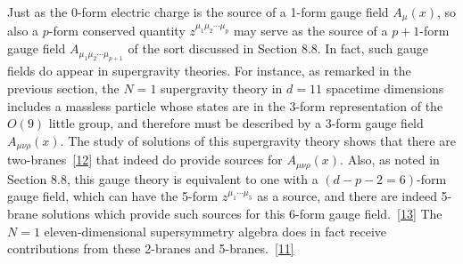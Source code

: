 Just as the 0-form electric charge is the source of a 1-form gauge field
\(A_\mu(x)\), so also a \(p\)-form conserved quantity
\(z^{\mu_1\mu_2\cdots\mu_p}\) may serve as the source of a \(p+1\)-form
gauge field \(A_{\mu_1\mu_2\cdots\mu_{p+1}}\) of the sort discussed in
Section 8.8. In fact, such gauge fields do appear in supergravity
theories. For instance, as remarked in the previous section, the \(N=1\)
supergravity theory in \(d=11\) spacetime dimensions includes a massless
particle whose states are in the 3-form representation of the \(O(9)\)
little group, and therefore must be described by a 3-form gauge field
\(A_{\mu\nu\rho}(x)\). The study of solutions of this supergravity theory
shows that there are two-branes~\hyperref[ch32-ref-12]{[12]} that indeed
do provide sources for \(A_{\mu\nu\rho}(x)\). Also, as noted in Section
8.8, this gauge theory is equivalent to one with a
\((d-p-2=6)\)-form gauge field, which can have the 5-form
\(z^{\mu_1\cdots\mu_5}\) as a source, and there are indeed 5-brane
solutions which provide such sources for this 6-form gauge
field.~\hyperref[ch32-ref-13]{[13]} The \(N=1\) eleven-dimensional
supersymmetry algebra does in fact receive contributions from these
2-branes and 5-branes.~\hyperref[ch32-ref-11]{[11]}

